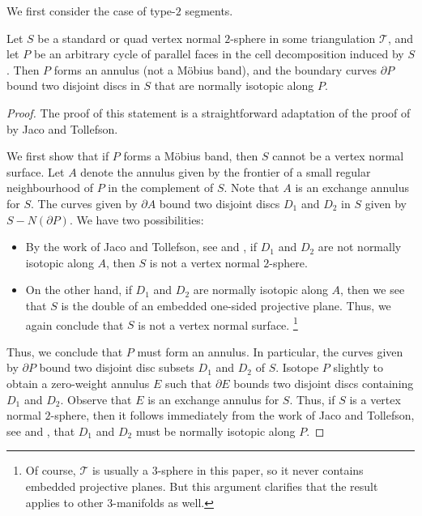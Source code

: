 \documentclass[a4paper,UKenglish,cleveref, autoref, thm-restate]{lipics-v2021}
\newcommand{\tri}{\mathcal{T}}
\begin{document}
We first consider the case of type-$2$ segments.

\begin{lemma}\label{lem:cycleParallel}
Let $S$ be a standard or quad vertex normal $2$-sphere in some triangulation $\tri$, and let $P$ be an arbitrary cycle of parallel faces in the cell decomposition induced by $S$. Then $P$ forms an annulus (not a M\"{o}bius band), and the boundary curves $\partial P$ bound two disjoint discs in $S$ that are normally isotopic along $P$.
\end{lemma}

\begin{proof}
The proof of this statement is a straightforward adaptation of the proof of \cite[Theorem 4.1]{jaco1995algorithms} by Jaco and Tollefson.

We first show that if $P$ forms a M\"{o}bius band, then $S$ cannot be a vertex normal surface.
Let $A$ denote the annulus given by the frontier of a small regular neighbourhood of $P$ in the complement of $S$. Note that $A$ is an exchange annulus for $S$.
The curves given by $\partial A$ bound two disjoint discs $D_1$ and $D_2$ in $S$ given by $S - N(\partial P)$.
We have two possibilities:
\begin{itemize}
\item By the work of Jaco and Tollefson, see \cite{jaco1995algorithms} and , if $D_1$ and $D_2$ are not normally isotopic along $A$, then $S$ is not a vertex normal $2$-sphere.
\item On the other hand, if $D_1$ and $D_2$ are normally isotopic along $A$, then we see that $S$ is the double of an embedded one-sided projective plane.
Thus, we again conclude that $S$ is not a vertex normal surface.%
\footnote{Of course, $\tri$ is usually a $3$-sphere in this paper, so it never contains embedded projective planes.
But this argument clarifies that the result applies to other $3$-manifolds as well.}
\end{itemize}

Thus, we conclude that $P$ must form an annulus.
In particular, the curves given by $\partial P$ bound two disjoint disc subsets $D_1$ and $D_2$ of $S$.
Isotope $P$ slightly to obtain a zero-weight annulus $E$ such that $\partial E$ bounds two disjoint discs containing $D_1$ and $D_2$.
Observe that $E$ is an exchange annulus for $S$.
Thus, if $S$ is a vertex normal $2$-sphere, then it follows immediately from the work of Jaco and Tollefson, see \cite{jaco1995algorithms} and , that $D_1$ and $D_2$ must be normally isotopic along $P$.
\end{proof}
\end{document}
